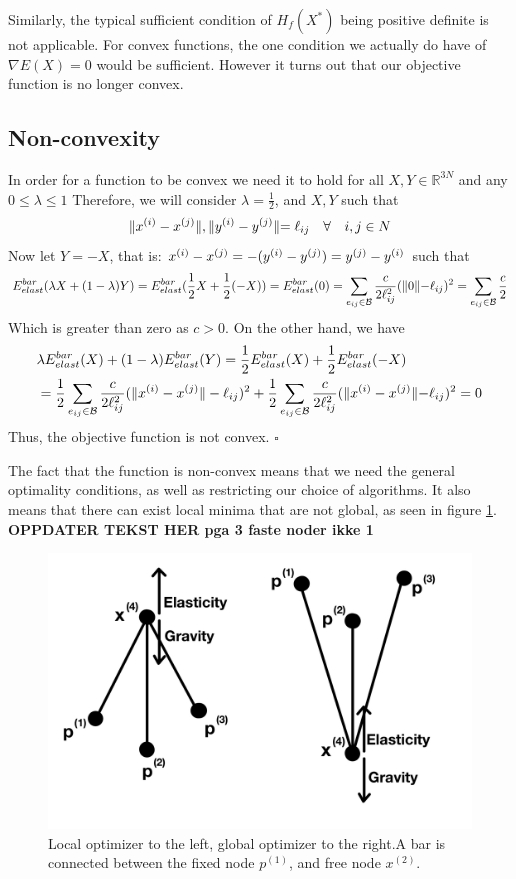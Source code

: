 Similarly, the typical sufficient condition of $H_f(X^*)$ being positive definite is not applicable. For convex functions, the one condition we actually do have of $\nabla E(X)=0$ would be sufficient. However it turns out that our objective function is no longer convex.

\subsection{Non-convexity}
In order for a function to be convex we need it to hold for all $X,Y \in \mathbb{R}^{3N}$ and any $0\leq \lambda \leq 1$ Therefore, we will consider $\lambda = \frac{1}{2}$, and $X,Y$ such that 
\begin{equation*}
    \rVert x^{(i)}-x^{(j)} \lVert, \rVert y^{(i)}-y^{(j)} \lVert = \ell_{ij} \quad \forall \quad i,j \in N
\end{equation*}
Now let $Y = -X$, that is: $x^{(i)}-x^{(j)} = -(y^{(i)}-y^{(j)}) = y^{(j)}-y^{(i)}$ such that
\begin{equation}
    \label{energyConv1}
    E^{bar}_{elast}(\lambda X + (1-\lambda) Y) = E^{bar}_{elast}(\frac{1}{2}X + \frac{1}{2}(-X)) = E^{bar}_{elast}(0) = \sum\limits_{e_{ij} \in \mathcal{B}} \frac{c}{2 \ell_{ij}^2} ( \rVert 0 \lVert - \ell_{ij})^2 = \sum\limits_{e_{ij} \in \mathcal{B}}\frac{c}{2}
\end{equation} Which is greater than zero as $c>0$.
On the other hand, we have
\begin{equation}
\label{energyConv2}
\begin{aligned}    
    &\lambda E^{bar}_{elast}(X) + (1-\lambda)E^{bar}_{elast}(Y) = \frac{1}{2}E^{bar}_{elast}(X) + \frac{1}{2}E^{bar}_{elast}(-X) \\& 
    = \frac{1}{2}\sum\limits_{e_{ij} \in \mathcal{B}} \frac{c}{2\ell_{ij}^2} (\lVert x^{(i)} - x^{(j)}\rVert - \ell_{ij})^2 + \frac{1}{2} \sum\limits_{e_{ij} \in \mathcal{B}}\frac{c}{2\ell_{ij}^2} (\rVert x^{(i)}-x^{(j)}\lVert-\ell_{ij})^2 = 0
    \end{aligned}
\end{equation}
Thus, the objective function is not convex. \hfill $\square$

The fact that the function is non-convex means that we need the general optimality conditions, as well as restricting our choice of algorithms. It also means that there can exist local minima that are not global, as seen in figure \ref{fig:local_optimizer}. \textbf{OPPDATER TEKST HER pga 3 faste noder ikke 1}
\begin{figure}[h]
    \centering\includegraphics[width=0.5\columnwidth]{Bilder/local_optimizer3.jpeg}
    \caption{Local optimizer to the left, global optimizer to the right.A bar is connected between the fixed node $p^{(1)}$, and free node $x^{(2)}$.}
    \label{fig:local_optimizer}
\end{figure}

